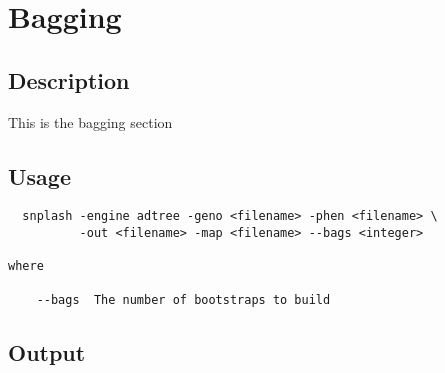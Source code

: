 \section{Bagging}
\label{sec:bagging}
\subsection{Description}
This is the bagging section
\subsection{Usage}
\begin{verbatim}
  snplash -engine adtree -geno <filename> -phen <filename> \
          -out <filename> -map <filename> --bags <integer>
             
where

    --bags  The number of bootstraps to build
\end{verbatim}

\subsection{Output}





